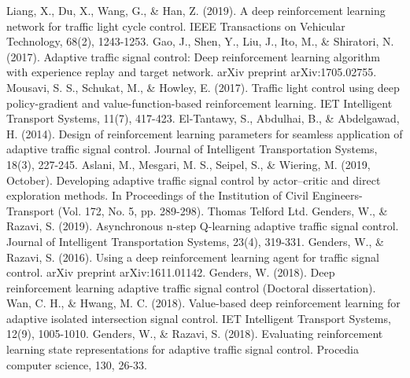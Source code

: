 \documentclass[a4paper, conference]{IEEEtran}
\begin{document}
\begin{thebibliography}{0}
 Liang, X., Du, X., Wang, G., \& Han, Z. (2019). A deep reinforcement learning network for traffic light cycle control. IEEE Transactions on Vehicular Technology, 68(2), 1243-1253.
 Gao, J., Shen, Y., Liu, J., Ito, M., \& Shiratori, N. (2017). Adaptive traffic signal control: Deep reinforcement learning algorithm with experience replay and target network. arXiv preprint arXiv:1705.02755.
 Mousavi, S. S., Schukat, M., \& Howley, E. (2017). Traffic light control using deep policy-gradient and value-function-based reinforcement learning. IET Intelligent Transport Systems, 11(7), 417-423.
 El-Tantawy, S., Abdulhai, B., \& Abdelgawad, H. (2014). Design of reinforcement learning parameters for seamless application of adaptive traffic signal control. Journal of Intelligent Transportation Systems, 18(3), 227-245.
 Aslani, M., Mesgari, M. S., Seipel, S., \& Wiering, M. (2019, October). Developing adaptive traffic signal control by actor–critic and direct exploration methods. In Proceedings of the Institution of Civil Engineers-Transport (Vol. 172, No. 5, pp. 289-298). Thomas Telford Ltd.
 Genders, W., \& Razavi, S. (2019). Asynchronous n-step Q-learning adaptive traffic signal control. Journal of Intelligent Transportation Systems, 23(4), 319-331.
 Genders, W., \& Razavi, S. (2016). Using a deep reinforcement learning agent for traffic signal control. arXiv preprint arXiv:1611.01142.
 Genders, W. (2018). Deep reinforcement learning adaptive traffic signal control (Doctoral dissertation).
 Wan, C. H., \& Hwang, M. C. (2018). Value-based deep reinforcement learning for adaptive isolated intersection signal control. IET Intelligent Transport Systems, 12(9), 1005-1010.
 Genders, W., \& Razavi, S. (2018). Evaluating reinforcement learning state representations for adaptive traffic signal control. Procedia computer science, 130, 26-33.


\end{thebibliography}
\end{document}

